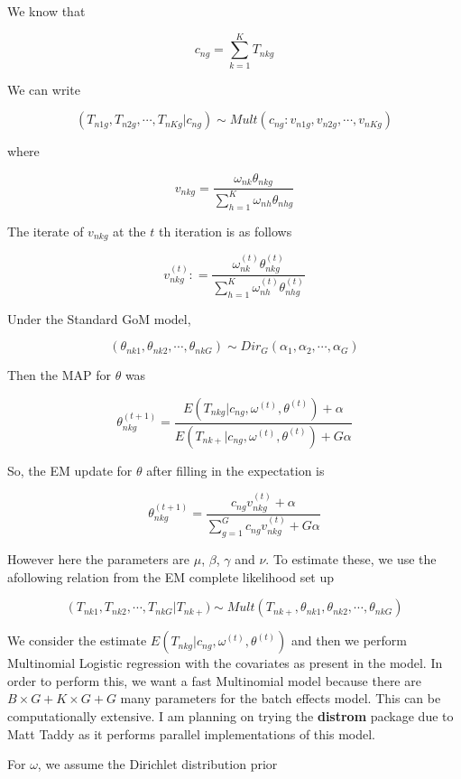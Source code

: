 \documentclass[a4paper, 12pt]{article}
\begin{document}
We know that 

$$ c_{ng} = \sum_{k=1}^{K} T_{nkg}  $$

We can write 

$$ \left( T_{n1g}, T_{n2g}, \cdots, T_{nKg}  | c_{ng} \right ) \sim Mult \left ( c_{ng}:  v_{n1g}, v_{n2g}, \cdots, v_{nKg} \right)  
$$

where 

$$ v_{nkg} = \frac{\omega_{nk} \theta_{nkg}}{\sum_{h=1}^{K} \omega_{nh} \theta_{nhg}} $$

The iterate of $v_{nkg}$ at the $t$ th iteration is as follows 

$$ v^{(t)}_{nkg} : =  \frac{\omega^{(t)}_{nk} \theta^{(t)}_{nkg}}{\sum_{h=1}^{K} \omega^{(t)}_{nh} \theta^{(t)}_{nhg}} $$


Under the Standard GoM model, 

$$ \left ( \theta_{nk1}, \theta_{nk2}, \cdots, \theta_{nkG} \right) \sim Dir_{G} \left (\alpha_1, \alpha_2, \cdots, \alpha_G \right) $$

Then the MAP for $\theta$ was 

$$ \theta^{(t+1)}_{nkg} = \frac{ E \left ( T_{nkg} | c_{ng}, \omega^{(t)}, \theta^{(t)} \right ) +  \alpha} {E \left ( T_{nk+} | c_{ng}, \omega^{(t)}, \theta^{(t)} \right ) + G\alpha} $$

So, the EM update for $\theta$ after filling in the expectation is 

$$  \theta^{(t+1)}_{nkg} = \frac{ c_{ng}  v^{(t)}_{nkg} +  \alpha} {\sum_{g=1}^{G}  c_{ng}  v^{(t)}_{nkg} + G\alpha} $$

However here the parameters are $\mu$, $\beta$, $\gamma$ and $\nu$. To estimate these, we use the afollowing relation from the EM complete likelihood set up

$$ \left(T_{nk1}, T_{nk2}, \cdots, T_{nkG} \right  | T_{nk+}) \sim Mult \left ( T_{nk+}, \theta_{nk1}, \theta_{nk2}, \cdots, \theta_{nkG} \right) $$

We consider the estimate  $E \left ( T_{nkg} | c_{ng} , \omega^{(t)}, \theta^{(t)}  \right ) $ and then we perform 
Multinomial Logistic regression with the covariates as present in the model.  In order to perform this, we want a fast Multinomial model because there are $B \times G + K \times G + G$ many parameters for the batch effects model. 
This can be computationally extensive. I am planning on trying the \textbf{distrom} package due to Matt Taddy as it performs parallel implementations of this model. 

For $\omega$, we assume the Dirichlet distribution prior 
\end{document}
